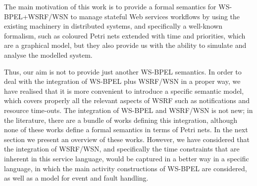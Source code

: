 The main motivation of this work is to provide a formal 
semantics for WS-BPEL+WSRF/WSN to manage stateful Web services workflows 
by using the existing machinery in distributed systems,
and specifically a well-known formalism, such as coloured
Petri nets extended with time and priorities, which are a graphical model, but they also
provide us with the ability to simulate and analyse the modelled
system.

Thus, our aim is not to provide just another WS-BPEL semantics. 
In order to deal with the integration of WS-BPEL plus WSRF/WSN in a proper way, 
we have realised that it is more convenient 
to introduce a specific semantic model, which  covers 
properly all the relevant aspects of WSRF such as notifications and 
resource time-outs. 
The integration of WS-BPEL and WSRF/WSN is not new; in the literature, 
there are a bundle of works defining this integration, although 
none of these works define a formal semantics in terms of Petri
nets. In the next section we present an overview
of these works. 
However, we have considered that the integration of WSRF/WSN, and specifically the
time constraints that are inherent in this service language, would be captured
in a better way in a specific language, in which the main activity constructions
of WS-BPEL are considered, as well as a model for event and fault handling. 


